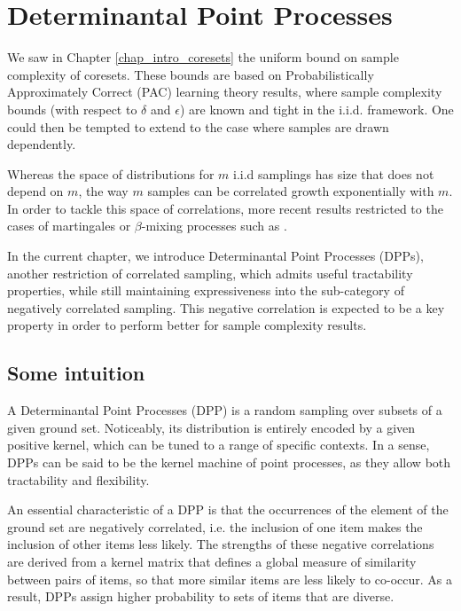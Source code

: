 \chapter{Determinantal Point Processes}
\label{chap_DPP}
We saw in Chapter \ref{chap_intro_coresets} the uniform bound on sample complexity of coresets. These bounds are based on Probabilistically Approximately Correct (PAC) learning theory results, where sample complexity bounds (with respect to $\delta$ and $\epsilon$) are known and tight in the i.i.d. framework. One could then be tempted to extend to the case where samples are drawn dependently.

Whereas the space of distributions for $m$ i.i.d samplings has size that does not depend on $m$, the way $m$ samples can be correlated growth exponentially with $m$. In order to tackle this space of correlations, more recent results restricted to the cases of martingales or $\beta$-mixing processes such as \cite{gao2016_learnability_beta_mixing}.

In the current chapter, we introduce Determinantal Point Processes (DPPs), another restriction of correlated sampling, which admits useful tractability properties, while still maintaining expressiveness into the sub-category of negatively correlated sampling. This negative correlation is expected to be a key property in order to perform better for sample complexity results.

\section{Some intuition}

A Determinantal Point Processes (DPP) is a random sampling over subsets of a given ground set. Noticeably, its distribution is entirely encoded by a given positive kernel, which can be tuned to a range of specific contexts. In a sense, DPPs can be said to be the kernel machine of point processes, as they allow both tractability and flexibility. 

An essential characteristic of a DPP is that the occurrences of the element of the ground set are negatively correlated, i.e. the inclusion of one item makes the inclusion of other items less likely. The strengths of these negative correlations are derived from a kernel matrix that defines a global measure of similarity between pairs of items, so that more similar items are less likely to co-occur. As a result, DPPs assign higher probability to sets of items that are diverse.




